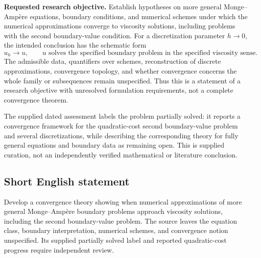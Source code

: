 \documentclass[11pt]{article}
\begin{document}
\textbf{Requested research objective.} Establish hypotheses on more general Monge--Amp\`ere equations, boundary conditions, and numerical schemes under which the numerical approximations converge to viscosity solutions, including problems with the second boundary-value condition. For a discretization parameter \(h\to0\), the intended conclusion has the schematic form
\[
u_h\longrightarrow u,
\qquad u\text{ solves the specified boundary problem in the specified viscosity sense}.
\]
The admissible data, quantifiers over schemes, reconstruction of discrete approximations, convergence topology, and whether convergence concerns the whole family or subsequences remain unspecified. Thus this is a statement of a research objective with unresolved formulation requirements, not a complete convergence theorem.

The supplied dated assessment labels the problem partially solved: it reports a convergence framework for the quadratic-cost second boundary-value problem and several discretizations, while describing the corresponding theory for fully general equations and boundary data as remaining open. This is supplied curation, not an independently verified mathematical or literature conclusion.
\subsection{Short English statement}
Develop a convergence theory showing when numerical approximations of more general Monge--Amp\`ere boundary problems approach viscosity solutions, including the second boundary-value problem. The source leaves the equation class, boundary interpretation, numerical schemes, and convergence notion unspecified. Its supplied partially solved label and reported quadratic-cost progress require independent review.
\end{document}
